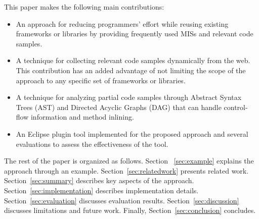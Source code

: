 This paper makes the following main contributions:\vspace*{-1ex}
\begin{itemize}
\item An approach for reducing programmers' effort while reusing existing frameworks or libraries by providing frequently used MISs and relevant code samples.
\item A technique for collecting relevant code samples dynamically from the web. This contribution has an added advantage of not limiting the scope of the approach to any specific set of frameworks or libraries.
\item A technique for analyzing partial code samples through Abstract Syntax Trees (AST) and Directed Acyclic Graphs (DAG) that can handle control-flow information and method inlining.
\item An Eclipse plugin tool implemented for the proposed approach
and several evaluations to assess the effectiveness of the tool.
\end{itemize}

The rest of the paper is organized as follows. Section
~\ref{sec:example} explains the approach through an example.
Section~\ref{sec:relatedwork} presents related work.
Section~\ref{sec:summary} describes key aspects of the approach.
Section~\ref{sec:implementation} describes implementation details.
Section~\ref{sec:evaluation} discusses evaluation results.
Section~\ref{sec:discussion} discusses limitations and future work.
Finally, Section~\ref{sec:conclusion} concludes.\vspace*{-1ex}
